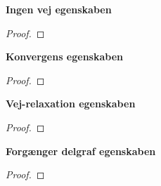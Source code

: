 \textbf{Ingen vej egenskaben}
\begin{corollary}
\end{corollary}

\begin{proof}
\end{proof}


\textbf{Konvergens egenskaben}
\begin{lemma}
\end{lemma}

\begin{proof}
\end{proof}


\textbf{Vej-relaxation egenskaben}
\begin{lemma}
\end{lemma}

\begin{proof}
\end{proof}


\textbf{Forgænger delgraf egenskaben}
\begin{lemma}
\end{lemma}

\begin{proof}
\end{proof}

